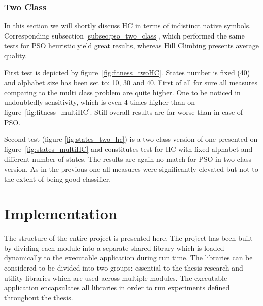 \documentclass{mini}
\begin{document}
\makeFigureHCClasses


\subsection{Two Class} \label{subsec:two_class_hc}
In this section we will shortly discuss HC in terms of indistinct native symbols. Corresponding subsection \ref{subsec:pso_two_class}, which performed the same tests for PSO heuristic yield great results, whereas Hill Climbing presents average quality.

First test is depicted by figure~\ref{fig:fitness_twoHC}. States number is fixed (40) and alphabet size has been set to: 10, 30 and 40. First of all for sure all measures comparing to the multi class problem are quite higher. One to be noticed in undoubtedly sensitivity, which is even 4 times higher than on figure~\ref{fig:fitness_multiHC}. Still overall results are far worse than in case of PSO.
\makeFigureIndistinctHC

Second test (figure \ref{fig:states_two_hc}) is a two class version of one presented on figure~\ref{fig:states_multiHC} and constitutes test for HC with fixed alphabet and different number of states. The results are again no match for PSO in two class version. As in the previous one all measures were significantly elevated but not to the extent of being good classifier.
\makeFigureStatesTwoHC

\appendix\label{appendix_a}

\chapter{Implementation} \label{chap:domain}
The structure of the entire project is presented here.
The project has been built by dividing each module into a separate shared library which is loaded dynamically to the executable application during run time. The libraries can be considered to be divided into two groups: essential to the thesis research and utility libraries which are used across multiple modules. The executable application encapsulates all libraries in order to run experiments defined throughout the thesis.
\end{document}
